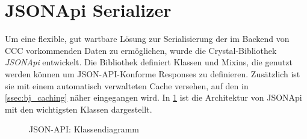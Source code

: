 \section{JSONApi Serializer}
\label{sec:b_jsonapi_serializer}

Um eine flexible, gut wartbare Lösung zur Serialisierung der im Backend von CCC
vorkommenden Daten zu ermöglichen, wurde die Crystal-Bibliothek \emph{JSONApi}
entwickelt.  Die Bibliothek definiert Klassen und Mixins, die genutzt werden
können um JSON-API-Konforme Responses zu definieren.  Zusätzlich ist sie mit
einem automatisch verwalteten Cache versehen, auf den in \cref{ssec:bj_caching}
näher eingegangen wird.  In \cref{fig:json_api_klassendiagramm} ist die
Architektur von JSONApi mit den wichtigsten Klassen dargestellt.

\begin{figure}
	\center
	
	\caption{JSON-API: Klassendiagramm}
	\label{fig:json_api_klassendiagramm}
\end{figure}






